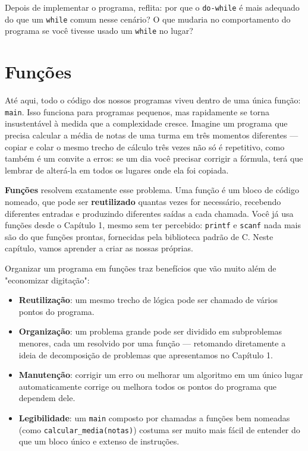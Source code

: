 \documentclass[12pt,a4paper,oneside]{extreport}
\begin{document}
Depois de implementar o programa, reflita: por que o \texttt{do-while} é mais adequado do que um \texttt{while} comum nesse cenário? O que mudaria no comportamento do programa se você tivesse usado um \texttt{while} no lugar?


\chapter{Funções}

Até aqui, todo o código dos nossos programas viveu dentro de uma única função: \texttt{main}. Isso funciona para programas pequenos, mas rapidamente se torna insustentável à medida que a complexidade cresce. Imagine um programa que precisa calcular a média de notas de uma turma em três momentos diferentes — copiar e colar o mesmo trecho de cálculo três vezes não só é repetitivo, como também é um convite a erros: se um dia você precisar corrigir a fórmula, terá que lembrar de alterá-la em todos os lugares onde ela foi copiada.

\textbf{Funções} resolvem exatamente esse problema. Uma função é um bloco de código nomeado, que pode ser \textbf{reutilizado} quantas vezes for necessário, recebendo diferentes entradas e produzindo diferentes saídas a cada chamada. Você já usa funções desde o Capítulo 1, mesmo sem ter percebido: \texttt{printf} e \texttt{scanf} nada mais são do que funções prontas, fornecidas pela biblioteca padrão de C. Neste capítulo, vamos aprender a criar as nossas próprias.

Organizar um programa em funções traz benefícios que vão muito além de "economizar digitação":

\begin{itemize}
    \item \textbf{Reutilização}: um mesmo trecho de lógica pode ser chamado de vários pontos do programa.
    \item \textbf{Organização}: um problema grande pode ser dividido em subproblemas menores, cada um resolvido por uma função — retomando diretamente a ideia de decomposição de problemas que apresentamos no Capítulo 1.
    \item \textbf{Manutenção}: corrigir um erro ou melhorar um algoritmo em um único lugar automaticamente corrige ou melhora todos os pontos do programa que dependem dele.
    \item \textbf{Legibilidade}: um \texttt{main} composto por chamadas a funções bem nomeadas (como \texttt{calcular\_media(notas)}) costuma ser muito mais fácil de entender do que um bloco único e extenso de instruções.
\end{itemize}
\end{document}
